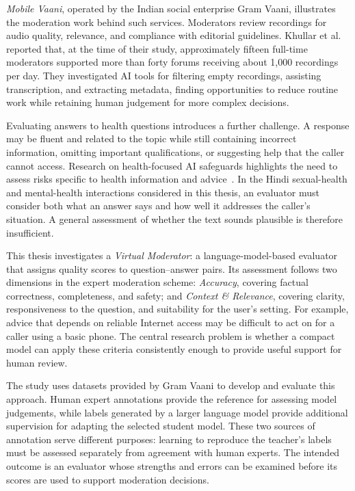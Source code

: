 \documentclass[11pt,a4paper]{article}
\begin{document}
\emph{Mobile Vaani}, operated by the Indian social enterprise Gram Vaani,
illustrates the moderation work behind such services. Moderators review
recordings for audio quality, relevance, and compliance with editorial
guidelines. Khullar et al.~\cite{khullar2021moderation} reported that, at the
time of their study, approximately fifteen full-time moderators supported more
than forty forums receiving about 1,000 recordings per day. They investigated
AI tools for filtering empty recordings, assisting transcription, and
extracting metadata, finding opportunities to reduce routine work while
retaining human judgement for more complex decisions.

Evaluating answers to health questions introduces a further challenge. A
response may be fluent and related to the topic while still containing
incorrect information, omitting important qualifications, or suggesting help
that the caller cannot access. Research on health-focused AI safeguards
highlights the need to assess risks specific to health information and
advice~\cite{hewitt2025health}. In the Hindi sexual-health and mental-health
interactions considered in this thesis, an evaluator must consider both what
an answer says and how well it addresses the caller's situation. A general
assessment of whether the text sounds plausible is therefore insufficient.

This thesis investigates a \emph{Virtual Moderator}: a language-model-based
evaluator that assigns quality scores to question--answer pairs. Its assessment
follows two dimensions in the expert moderation scheme: \emph{Accuracy},
covering factual correctness, completeness, and safety; and \emph{Context \&
Relevance}, covering clarity, responsiveness to the question, and suitability
for the user's setting. For example, advice that depends on reliable Internet
access may be difficult to act on for a caller using a basic phone. The central
research problem is whether a compact model can apply these criteria
consistently enough to provide useful support for human review.

The study uses datasets provided by Gram Vaani to develop and evaluate this
approach. Human expert annotations provide the reference for assessing model
judgements, while labels generated by a larger language model provide
additional supervision for adapting the selected student model. These two
sources of annotation serve different purposes: learning to reproduce the
teacher's labels must be assessed separately from agreement with human
experts. The intended outcome is an evaluator whose strengths and errors can
be examined before its scores are used to support moderation decisions.
\end{document}
